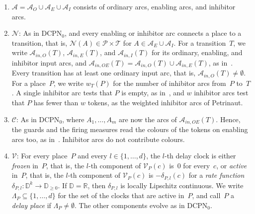 \documentclass[11pt]{article}
\theoremstyle{definition}
\newcommand{\Real}{\mathbb{R}}
\newcommand{\Dom}{\mathbb{D}}
\newcommand{\DCPN}[1]{\texorpdfstring{\textup{DCPN}\ensuremath{_{#1}}}{DCPN#1}}
\begin{document}
\begin{enumerate}
  \item[3.] $\mathcal{A} = \mathcal{A}_O \cup \mathcal{A}_E \cup
    \mathcal{A}_I$ consists of ordinary arcs, enabling arcs, and inhibitor
    arcs.

  \item[4.] $\mathcal{N}$: As in \DCPN{0}, and every enabling or inhibitor
    arc connects a place to a transition, that is, $\mathcal{N}(A) \in
    \mathcal{P} \times \mathcal{T}$ for $A \in \mathcal{A}_E \cup
    \mathcal{A}_I$. For a transition~$T$, we write
    $\mathcal{A}_{\mathit{in},O}(T)$, $\mathcal{A}_{\mathit{in},E}(T)$, and
    $\mathcal{A}_{\mathit{in},I}(T)$ for its ordinary, enabling, and
    inhibitor input arcs, and $\mathcal{A}_{\mathit{in},OE}(T) =
    \mathcal{A}_{\mathit{in},O}(T) \cup \mathcal{A}_{\mathit{in},E}(T)$, as
    in~\cite{EverdijBlom2005}. Every transition has at least one ordinary
    input arc, that is, $\mathcal{A}_{\mathit{in},O}(T) \ne \emptyset$. For
    a place~$P$, we write $w_T(P)$ for the number of inhibitor arcs from~$P$
    to~$T$. A single inhibitor arc tests that $P$ is empty, as
    in~\cite{EverdijBlom2005}, and $w$ inhibitor arcs test that $P$ has
    fewer than $w$ tokens, as the weighted inhibitor arcs of Petrinaut.

  \item[6.] $\mathcal{C}$: As in \DCPN{0}, where $A_1, \dots, A_m$ are now
    the arcs of $\mathcal{A}_{\mathit{in},OE}(T)$. Hence, the guards and the
    firing measures read the colours of the tokens on enabling arcs too, as
    in~\cite{EverdijBlom2005}. Inhibitor arcs do not contribute colours.

  \item[7.] $\mathcal{V}$: For every place~$P$ and every
    $l \in \{1, \dots, d\}$, the $l$-th delay clock is either \emph{frozen}
    in~$P$, that is, the $l$-th component of $\mathcal{V}_P(c)$ is~$0$ for
    every~$c$, or \emph{active} in~$P$, that is, the $l$-th component of
    $\mathcal{V}_P(c)$ is $-\delta_{P, l}(c)$ for a \emph{rate function}
    $\delta_{P, l} : \Dom^k \to \Dom_{\ge 0}$. If $\Dom = \Real$, then
    $\delta_{P, l}$ is locally Lipschitz continuous. We write
    $\Lambda_P \subseteq \{1, \dots, d\}$ for the set of the clocks that are
    active in~$P$, and call~$P$ a \emph{delay place} if
    $\Lambda_P \ne \emptyset$. The other components evolve as in \DCPN{0}.


\end{enumerate}
\end{document}
